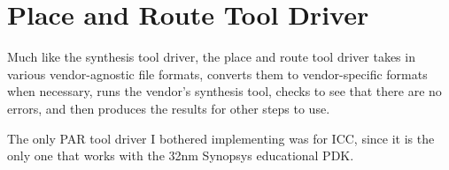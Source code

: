 \documentclass{article}
\begin{document}
\section{Place and Route Tool Driver}

Much like the synthesis tool driver, the place and route tool driver takes in
various vendor-agnostic file formats, converts them to vendor-specific formats
when necessary, runs the vendor's synthesis tool, checks to see that there are
no errors, and then produces the results for other steps to use.

The only PAR tool driver I bothered implementing was for ICC, since it is the
only one that works with the 32nm Synopsys educational PDK.
\end{document}

